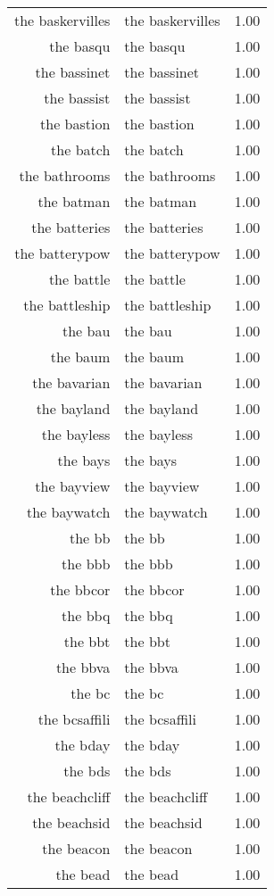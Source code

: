 \begin{table}[ht]
\begin{tabular}{rlr}
  the baskervilles & the baskervilles & 1.00 \\ 
  the basqu & the basqu & 1.00 \\ 
  the bassinet & the bassinet & 1.00 \\ 
  the bassist & the bassist & 1.00 \\ 
  the bastion & the bastion & 1.00 \\ 
  the batch & the batch & 1.00 \\ 
  the bathrooms & the bathrooms & 1.00 \\ 
  the batman & the batman & 1.00 \\ 
  the batteries & the batteries & 1.00 \\ 
  the batterypow & the batterypow & 1.00 \\ 
  the battle & the battle & 1.00 \\ 
  the battleship & the battleship & 1.00 \\ 
  the bau & the bau & 1.00 \\ 
  the baum & the baum & 1.00 \\ 
  the bavarian & the bavarian & 1.00 \\ 
  the bayland & the bayland & 1.00 \\ 
  the bayless & the bayless & 1.00 \\ 
  the bays & the bays & 1.00 \\ 
  the bayview & the bayview & 1.00 \\ 
  the baywatch & the baywatch & 1.00 \\ 
  the bb & the bb & 1.00 \\ 
  the bbb & the bbb & 1.00 \\ 
  the bbcor & the bbcor & 1.00 \\ 
  the bbq & the bbq & 1.00 \\ 
  the bbt & the bbt & 1.00 \\ 
  the bbva & the bbva & 1.00 \\ 
  the bc & the bc & 1.00 \\ 
  the bcsaffili & the bcsaffili & 1.00 \\ 
  the bday & the bday & 1.00 \\ 
  the bds & the bds & 1.00 \\ 
  the beachcliff & the beachcliff & 1.00 \\ 
  the beachsid & the beachsid & 1.00 \\ 
  the beacon & the beacon & 1.00 \\ 
  the bead & the bead & 1.00 \\ 

\end{tabular}
\end{table}
